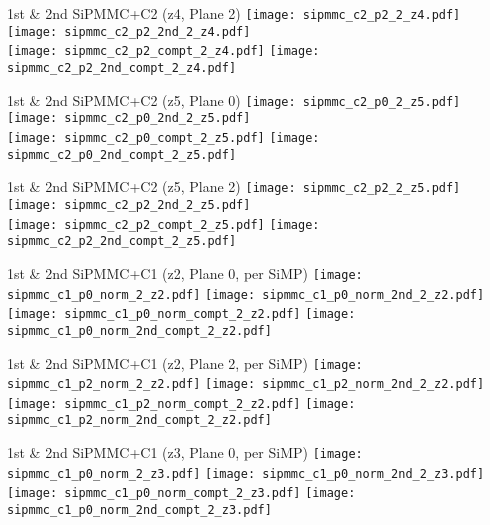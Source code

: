 \documentclass{beamer}
\begin{document}
\begin{frame}{1st \& 2nd SiPMMC+C2 (z4, Plane 2)}
	\texttt{[image: sipmmc\_c2\_p2\_2\_z4.pdf]}
	\texttt{[image: sipmmc\_c2\_p2\_2nd\_2\_z4.pdf]} \\
	
		\texttt{[image: sipmmc\_c2\_p2\_compt\_2\_z4.pdf]}
		\texttt{[image: sipmmc\_c2\_p2\_2nd\_compt\_2\_z4.pdf]} 
\end{frame}

\begin{frame}{1st \& 2nd SiPMMC+C2 (z5, Plane 0)}
	\texttt{[image: sipmmc\_c2\_p0\_2\_z5.pdf]}
	\texttt{[image: sipmmc\_c2\_p0\_2nd\_2\_z5.pdf]} \\
	
		\texttt{[image: sipmmc\_c2\_p0\_compt\_2\_z5.pdf]}
		\texttt{[image: sipmmc\_c2\_p0\_2nd\_compt\_2\_z5.pdf]}
\end{frame}

\begin{frame}{1st \& 2nd SiPMMC+C2 (z5, Plane 2)}
	\texttt{[image: sipmmc\_c2\_p2\_2\_z5.pdf]}
	\texttt{[image: sipmmc\_c2\_p2\_2nd\_2\_z5.pdf]} \\
	
		\texttt{[image: sipmmc\_c2\_p2\_compt\_2\_z5.pdf]}
		\texttt{[image: sipmmc\_c2\_p2\_2nd\_compt\_2\_z5.pdf]}
\end{frame}

\begin{frame}{1st \& 2nd SiPMMC+C1 (z2, Plane 0, per SiMP)}
	\texttt{[image: sipmmc\_c1\_p0\_norm\_2\_z2.pdf]}
	\texttt{[image: sipmmc\_c1\_p0\_norm\_2nd\_2\_z2.pdf]} \\
	
		\texttt{[image: sipmmc\_c1\_p0\_norm\_compt\_2\_z2.pdf]}
		\texttt{[image: sipmmc\_c1\_p0\_norm\_2nd\_compt\_2\_z2.pdf]}
\end{frame}

\begin{frame}{1st \& 2nd SiPMMC+C1 (z2, Plane 2, per SiMP)}
	\texttt{[image: sipmmc\_c1\_p2\_norm\_2\_z2.pdf]}
	\texttt{[image: sipmmc\_c1\_p2\_norm\_2nd\_2\_z2.pdf]} \\
	
		\texttt{[image: sipmmc\_c1\_p2\_norm\_compt\_2\_z2.pdf]}
		\texttt{[image: sipmmc\_c1\_p2\_norm\_2nd\_compt\_2\_z2.pdf]}
\end{frame}

\begin{frame}{1st \& 2nd SiPMMC+C1 (z3, Plane 0, per SiMP)}
	\texttt{[image: sipmmc\_c1\_p0\_norm\_2\_z3.pdf]}
	\texttt{[image: sipmmc\_c1\_p0\_norm\_2nd\_2\_z3.pdf]} \\
	
		\texttt{[image: sipmmc\_c1\_p0\_norm\_compt\_2\_z3.pdf]}
		\texttt{[image: sipmmc\_c1\_p0\_norm\_2nd\_compt\_2\_z3.pdf]}
\end{frame}
\end{document}
